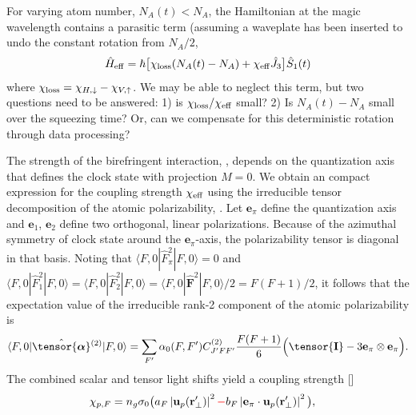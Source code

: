 \documentclass[preprint,aps,pra,onecolumn]{revtex4-1} %
\newcommand{\poltens}{\hat{\tensor{\boldsymbol{\alpha}}}}
\newcommand{\unittens}{\tensor{\mathbf{I}}}
\newcommand{\chieff}{\chi_{\rm eff}}
\newcommand{\change}[1]{{\color{RoyalBlue} #1}}
\newcommand{\comment}[1]{{\color{Maroon} #1}}
\newcommand{\error}[1]{{\color{red} #1}}
\begin{document}
\change{For varying atom number, $N_A(t) < N_A$, the Hamiltonian at the magic wavelength contains a parasitic term (assuming a waveplate has been inserted to undo the constant rotation from $N_A/2$,
	\begin{align}
		\hat{H}_{\rm eff} = \hbar \big[ \chi_{\rm loss} (N_A(t)-N_A) + \chieff \hat{J}_3 \big]\hat{S}_1(t)
	\end{align}
where $\chi_{\rm loss} = \chi_{H,\downarrow} - \chi_{V,\uparrow}$.  \comment{We may be able to neglect this term, but two questions need to be answered: 1) is $\chi_{\rm loss}/\chieff$ small?  2) Is $N_A(t) - N_A$ small over the squeezing time? Or, can we compensate for this deterministic rotation through data processing?}
}


The strength of the birefringent interaction, , depends on the quantization axis that defines the clock state with projection $M=0$.  We obtain an compact expression for the coupling strength $\chi_{\text{eff}}$ using the irreducible tensor decomposition of the atomic polarizability, .  Let $\mathbf{e}_\pi$ define the quantization axis and $\mathbf{e}_{1}$, $\mathbf{e}_{2}$ define two orthogonal, linear polarizations.  Because of the azimuthal symmetry of clock state around the $\mathbf{e}_\pi$-axis, the polarizability tensor is diagonal in that basis.  Noting that $\langle F,0 | \hat{F}_{\pi}^2| F,0 \rangle =0$ and $\langle F,0 | \hat{F}_{1}^2| F,0 \rangle = \langle F,0 | \hat{F}_{2}^2| F,0 \rangle = \langle F,0 | \hat{\mathbf{F}}^2| F,0 \rangle /2 =F(F+1)/2$, it follows that the expectation value of the irreducible rank-2 component of the atomic polarizability is
	\begin{align} \label{Eq::CouplingAngleMagic}
		\langle F,0 | \poltens \phantom{}^{(2)}| F,0 \rangle  %
		= \sum_{F'} \alpha_0(F,F') C^{(2)}_{J'FF'} \frac{F(F+1)}{6} \Big( \unittens - 3\mathbf{e}_\pi \otimes \mathbf{e}_\pi \Big).
	\end{align}
The combined scalar and tensor light shifts yield a coupling strength []
	\begin{align}
		\chi_{p,F} %
		&  = n_g \sigma_0 \big(  a_{F} \left|\mathbf{u}_p(\br'_\perp)\right|^2 \error{-} b_{F} \left|\mathbf{e}_\pi \cdot \mathbf{u}_p(\br'_\perp)\right|^2 \big), \label{Eq::ClockStateCoupling}
	\end{align}
\end{document}
